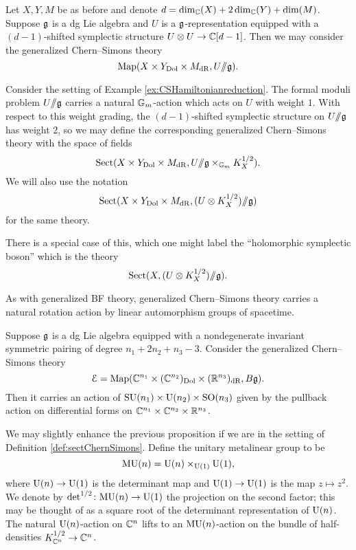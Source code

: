 \documentclass[10pt, oneside]{article}
\begin{document}
\begin{example}
Let $X,Y,M$ be as before and denote $d = \dim_\mathbb C(X) + 2\dim_\mathbb C(Y) + \dim(M)$. Suppose $\mathfrak g$ is a dg Lie algebra and $U$ is a $\mathfrak g$-representation equipped with a $(d-1)$-shifted symplectic structure $U\otimes U\rightarrow  \mathbb C[d-1]$. Then we may consider the generalized Chern--Simons theory
\[\operatorname{Map}(X\times Y_{\mathrm{Dol}}\times M_{\mathrm{dR}}, U /\!\!/ \mathfrak g).\]
\label{ex:CSHamiltonianreduction}
\end{example}

\begin{example}
Consider the setting of Example \ref{ex:CSHamiltonianreduction}. The formal moduli problem $U/\!\!/ \mathfrak g$ carries a natural $\mathbb{G}_m$-action which acts on $U$ with weight $1$. With respect to this weight grading, the $(d-1)$-shifted symplectic structure on $U/\!\!/ \mathfrak g$ has weight $2$, so we may define the corresponding generalized Chern--Simons theory with the space of fields
\[\mathrm{Sect}(X\times Y_{\mathrm{Dol}}\times M_{\mathrm{dR}}, U/\!\!/ \mathfrak g\times_{\mathbb{G}_m} K_X^{1/2}).\]
We will also use the notation
\[\mathrm{Sect}(X\times Y_{\mathrm{Dol}}\times M_{\mathrm{dR}}, (U\otimes K_X^{1/2})/\!\!/ \mathfrak g)\]
for the same theory.
\end{example}

\begin{example}
There is a special case of this, which one might label the ``holomorphic symplectic boson'' \cite[Definition 4.8]{SWSuperconformal} which is the theory
\[\mathrm{Sect}(X, (U\otimes K_X^{1/2})/\!\!/\mathfrak g) . \]
\end{example}

As with generalized BF theory, generalized Chern--Simons theory carries a natural rotation action by linear automorphism groups of spacetime.

\begin{prop}
Suppose $\mathfrak g$ is a dg Lie algebra equipped with a nondegenerate invariant symmetric pairing of degree $n_1+2n_2+n_3-3$. Consider the generalized Chern--Simons theory
\[\mathcal E = \operatorname{Map}(\mathbb C^{n_1}\times (\mathbb C^{n_2})_{\mathrm{Dol}}\times (\mathbb R^{n_3})_{\mathrm{dR}}, B\mathfrak g).\]
Then it carries an action of $\mathrm{SU}(n_1)\times \mathrm{U}(n_2)\times \mathrm{SO}(n_3)$ given by the pullback action on differential forms on $\mathbb C^{n_1}\times \mathbb C^{n_2}\times \mathbb R^{n_3}$.
\end{prop}

We may slightly enhance the previous proposition if we are in the setting of Definition \ref{def:sectChernSimons}. Define the unitary metalinear group to be
\[\mathrm{MU}(n) = \mathrm{U}(n)\times_{\mathrm{U}(1)} \mathrm{U}(1),\]
where $\mathrm{U}(n)\rightarrow \mathrm{U}(1)$ is the determinant map and $\mathrm{U}(1)\rightarrow \mathrm{U}(1)$ is the map $z\mapsto z^2$. We denote by $\det^{1/2}\colon \mathrm{MU}(n)\rightarrow \mathrm{U}(1)$ the projection on the second factor; this may be thought of as a square root of the determinant representation of $\mathrm{U}(n)$. The natural $\mathrm{U}(n)$-action on $\mathbb C^n$ lifts to an $\mathrm{MU}(n)$-action on the bundle of half-densities $K_{\mathbb C^n}^{1/2}\rightarrow \mathbb C^n$.
\end{document}
